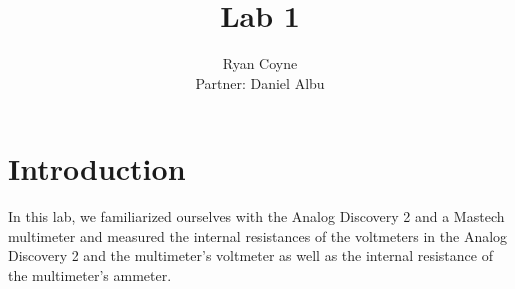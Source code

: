 \documentclass{article}
\title{Lab 1}
\author{Ryan Coyne \\ Partner: Daniel Albu}
\begin{document}
    \maketitle

    \section{Introduction}
    
    In this lab, we familiarized ourselves with the Analog Discovery 2 and a Mastech multimeter and measured the internal resistances of the voltmeters in the Analog Discovery 2 and the multimeter's voltmeter as well as the internal resistance of the multimeter's ammeter.
\end{document}
